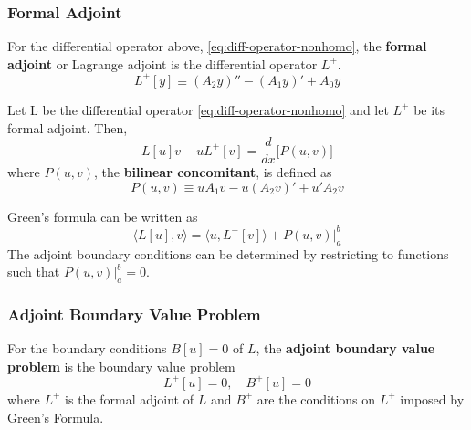 \subsubsection{Formal Adjoint}
For the differential operator above, \ref{eq:diff-operator-nonhomo}, the \textbf{formal adjoint} or Lagrange adjoint is the differential operator $L^+$.
\begin{equation}
    L^+[y] \equiv (A_2y)'' - (A_1y)' + A_0y
\end{equation}

\begin{theorem}
 Let L be the differential operator \ref{eq:diff-operator-nonhomo} and let $L^+$ be its formal adjoint. Then,
 \begin{equation}
     L[u]v - uL^+[v] = \frac{d}{dx}\Big[P(u,v)\Big]
 \end{equation}
 where $P(u,v)$, the \textbf{bilinear concomitant}, is defined as
 \begin{equation}
     P(u,v) \equiv uA_1v - u(A_2v)' +u'A_2v
 \end{equation}
\end{theorem}

\begin{theorem}
Green's formula can be written as
  \begin{equation}
      \langle L[u],v \rangle = \langle u, L^+[v] \rangle + P(u,v)\Big|_a^b
  \end{equation}
The adjoint boundary conditions can be determined by restricting to functions such that $P(u,v)\Big|_a^b=0$.
\end{theorem}

\subsubsection{Adjoint Boundary Value Problem}
For the boundary conditions $B[u]=0$ of $L$, the \textbf{adjoint boundary value problem} is the boundary value problem
\begin{equation} \label{eq:adjoint-bvp}
    L^+[u]=0, \quad B^+[u]=0
\end{equation}
where $L^+$ is the formal adjoint of $L$ and $B^+$ are the conditions on $L^+$ imposed by Green's Formula.


